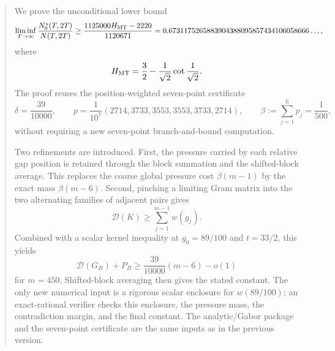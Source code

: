 \begin{abstract}
We prove the unconditional lower bound
\[
 \liminf_{T\to\infty}\frac{N_0^s(T,2T)}{N(T,2T)}
 \ge
 \frac{1125000H_{\rm MT}-2220}{1120671}
 =
 0.6731175265883904388095857434106058666\ldots,
\]
where
\[
 H_{\rm MT}
 =
 \frac32-\frac1{\sqrt2}\cot\frac1{\sqrt2}.
\]
The proof reuses the position-weighted seven-point certificate
\[
 \delta=\frac{39}{10000},
 \qquad
 p=\frac1{10^7}(2714,3733,3553,3553,3733,2714),
 \qquad
 \beta:=\sum_{j=1}^6p_j=\frac1{500},
\]
without requiring a new seven-point branch-and-bound computation.

Two refinements are introduced.  First, the pressure carried by each relative
gap position is retained through the block summation and the shifted-block
average.  This replaces the coarse global pressure cost
\(\beta(m-1)\) by the exact mass \(\beta(m-6)\).  Second, pinching a limiting
Gram matrix into the two alternating families of adjacent pairs gives
\[
 \mathcal D(K)\ge\sum_{j=1}^{m-1}w(g_j).
\]
Combined with a scalar kernel inequality at
\(g_0=89/100\) and \(t=33/2\), this yields
\[
 \mathcal D(G_B)+P_B
 \ge \frac{39}{10000}(m-6)-o(1)
\]
for \(m=450\).  Shifted-block averaging then gives the stated constant.
The only new numerical input is a rigorous scalar enclosure for
\(w(89/100)\); an exact-rational verifier checks this enclosure, the pressure
mass, the contradiction margin, and the final constant.  The analytic/Gabor
package and the seven-point certificate are the same inputs as in the previous
version.
\end{abstract}
